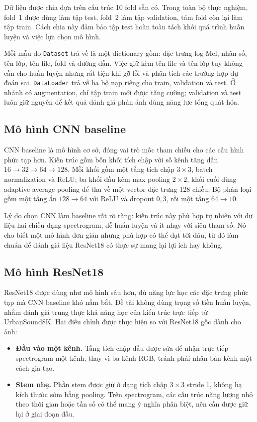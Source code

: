 Dữ liệu được chia dựa trên cấu trúc 10 fold sẵn có. Trong toàn bộ thực nghiệm,
fold~1 được dùng làm tập test, fold~2 làm tập validation, tám fold còn lại làm
tập train. Cách chia này đảm bảo tập test hoàn toàn tách khỏi quá trình huấn
luyện và việc lựa chọn mô hình.

Mỗi mẫu do \texttt{Dataset} trả về là một dictionary gồm: đặc trưng log-Mel, nhãn
số, tên lớp, tên file, fold và đường dẫn. Việc giữ kèm tên file và tên lớp tuy
không cần cho huấn luyện nhưng rất tiện khi gỡ lỗi và phân tích các trường hợp dự
đoán sai. \texttt{DataLoader} trả về ba bộ nạp riêng cho train, validation và
test. Ở nhánh có augmentation, chỉ tập train mới được tăng cường; validation và
test luôn giữ nguyên để kết quả đánh giá phản ánh đúng năng lực tổng quát hóa.

\subsection{Mô hình CNN baseline}

CNN baseline là mô hình cơ sở, đóng vai trò mốc tham chiếu cho các cấu hình phức
tạp hơn. Kiến trúc gồm bốn khối tích chập với số kênh tăng dần $16 \to 32 \to 64
\to 128$. Mỗi khối gồm một tầng tích chập $3\times 3$, batch normalization và
ReLU; ba khối đầu kèm max pooling $2\times 2$, khối cuối dùng adaptive average
pooling để thu về một vector đặc trưng 128 chiều. Bộ phân loại gồm một tầng ẩn
$128 \to 64$ với ReLU và dropout $0{,}3$, rồi một tầng $64 \to 10$.

Lý do chọn CNN làm baseline rất rõ ràng: kiến trúc này phù hợp tự nhiên với dữ
liệu hai chiều dạng spectrogram, dễ huấn luyện và ít nhạy với siêu tham số. Nó
cho biết một mô hình đơn giản nhưng phù hợp có thể đạt tới đâu, từ đó làm chuẩn
để đánh giá liệu ResNet18 có thực sự mang lại lợi ích hay không.

\subsection{Mô hình ResNet18}

ResNet18 được dùng như mô hình sâu hơn, đủ năng lực học các đặc trưng phức tạp mà
CNN baseline khó nắm bắt. Đề tài không dùng trọng số tiền huấn luyện, nhằm đánh
giá trung thực khả năng học của kiến trúc trực tiếp từ UrbanSound8K. Hai điều
chỉnh được thực hiện so với ResNet18 gốc dành cho ảnh:

\begin{itemize}[leftmargin=1.4em,itemsep=2pt]
  \item \textbf{Đầu vào một kênh.} Tầng tích chập đầu được sửa để nhận trực tiếp
        spectrogram một kênh, thay vì ba kênh RGB, tránh phải nhân bản kênh một
        cách giả tạo.
  \item \textbf{Stem nhẹ.} Phần stem được giữ ở dạng tích chập $3\times 3$ stride
        1, không hạ kích thước sớm bằng pooling. Trên spectrogram, các cấu trúc
        năng lượng nhỏ theo thời gian hoặc tần số có thể mang ý nghĩa phân biệt,
        nên cần được giữ lại ở giai đoạn đầu.
\end{itemize}

